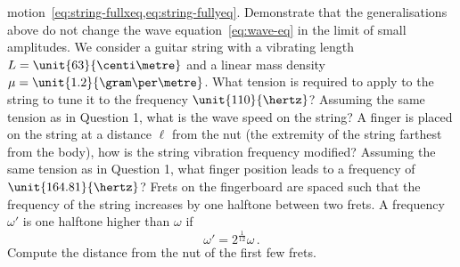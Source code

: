 \begin{ExerciseList}
  motion~\cref{eq:string-fullxeq,eq:string-fullyeq}. \Question Demonstrate that the
  generalisations above do not change the wave equation~\cref{eq:wave-eq} in the limit of
  small amplitudes.
  \Exercise[label=guitar] We consider a guitar string with a vibrating length $L=\unit{63}{\centi\metre}$ and a linear mass density $\mu=\unit{1.2}{\gram\per\metre}$.
  \Question What tension is required to apply to the string to tune it to the frequency $\unit{110}{\hertz}$?
  \Question Assuming the same tension as in Question 1, what is the wave speed on the string?
  \Question A finger is placed on the string at a distance $\ell$ from the nut (the extremity of the string farthest from the body), how is the string vibration frequency modified?
  \Question Assuming the same tension as in Question 1, what finger position leads to a frequency of $\unit{164.81}{\hertz}$?
  \Question Frets on the fingerboard are spaced such that the frequency of the string increases by one halftone between two frets. A frequency $\omega'$ is one halftone higher than $\omega$ if
  \begin{equation}
    \omega'=2^{\frac{1}{12}}\omega\,.
  \end{equation}
  Compute the distance from the nut of the first few frets.

\end{ExerciseList}
